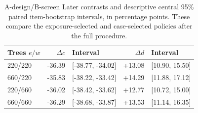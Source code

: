 \begin{table}[t]\centering\small
\caption{A-design/B-screen Later contrasts and descriptive central 95\% paired item-bootstrap intervals, in percentage points. These compare the exposure-selected and case-selected policies after the full procedure.}\label{tab:v7-contrast}
\begin{tabular}{lrlrl}\toprule
Trees $e/w$ & $\Delta c$ & Interval & $\Delta d$ & Interval\\\midrule
220/220 & -36.39 & [-38.77, -34.02] & +13.08 & [10.90, 15.50] \\
660/220 & -35.83 & [-38.22, -33.42] & +14.29 & [11.88, 17.12] \\
220/660 & -36.02 & [-38.42, -33.62] & +12.77 & [10.72, 15.00] \\
660/660 & -36.29 & [-38.68, -33.87] & +13.53 & [11.14, 16.35] \\
\bottomrule\end{tabular}\end{table}
